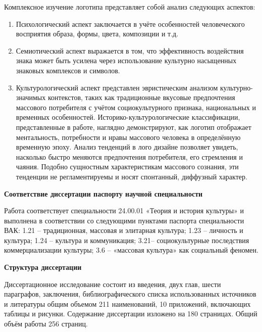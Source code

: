 Комплексное изучение логотипа представляет собой анализ следующих аспектов:
\begin{enumerate}
\item Психологический аспект заключается в учёте особенностей человеческого восприятия образа, формы, цвета, композиции и т.д.
\item Семиотический аспект выражается в том, что эффективность воздействия знака может быть усилена через использование культурно насыщенных знаковых комплексов и символов.
\item Культурологический аспект представлен эвристическим анализом культурно\hyp{}значимых контекстов, таких как традиционные вкусовые предпочтения массового потребителя с учётом социокультурного признака, национальных и временных особенностей. Историко-культурологические классификации, представленные в работе, наглядно демонстрируют, как логотип отображает ментальность, потребности и нравы массового человека в определённую временную эпоху. Анализ тенденций в лого дизайне позволяет увидеть, насколько быстро меняются предпочтения потребителя, его стремления и чаяния. Подобно сущностным характеристикам массового сознания, эти тенденции не регламентируемы и носят спонтанный, диффузный характер. 
\end{enumerate}

\textbf{Соответствие диссертации паспорту научной специальности}

Работа соответствует специальности 24.00.01 «Теория и история культуры» и выполнена в соответствии со следующими пунктами паспорта специальности ВАК: 1.21 – традиционная, массовая и элитарная культура; 1.23 – личность и культура; 1.24 – культура и коммуникация; 3.21– социокультурные последствия коммерциализации культуры; 3.6 – «массовая культура» как социальный феномен.

\textbf{Структура диссертации}

Диссертационное исследование состоит из введения, двух глав, шести параграфов, заключения, библиографического списка использованных источников и литературы общим объемом 211 наименований, 10 приложений, включающих таблицы и рисунки. Содержание диссертации изложено на 180 страницах. Общий объём работы 256 страниц.
